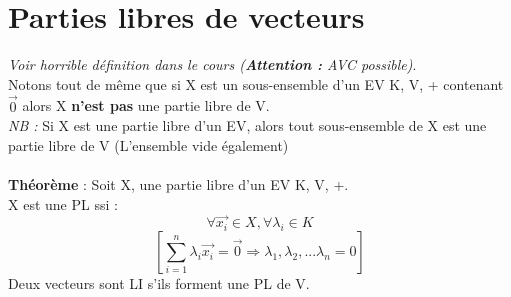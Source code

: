 \documentclass[british,french,11pt, a4paper, openany]{book}
\begin{document}
	\section{Parties libres de vecteurs}
	\textit{Voir horrible définition dans le cours (\textbf{Attention :} AVC possible)}.\\
	Notons tout de même que si X est un sous-ensemble d'un EV K, V, + contenant $\vec{0}$ alors X \textbf{n'est pas} une partie libre de V.\\
	\textit{NB :} Si X est une partie libre d'un EV, alors tout sous-ensemble de X est une partie libre de V (L'ensemble vide également)\\\\
	\textbf{Théorème } : Soit X, une partie libre d'un EV K, V, +.\\
	X est une PL ssi :
	$$\forall \vec{x_{i}} \in X, \forall \lambda_{i} \in K$$
	$$[\sum_{i=1}^{n} \lambda_{i}\vec{x_{i}} = \vec{0} \Rightarrow \lambda_{1}, \lambda_{2}, ... \lambda_{n} = 0]$$
	Deux vecteurs sont LI s'ils forment une PL de V.
	
\end{document}
